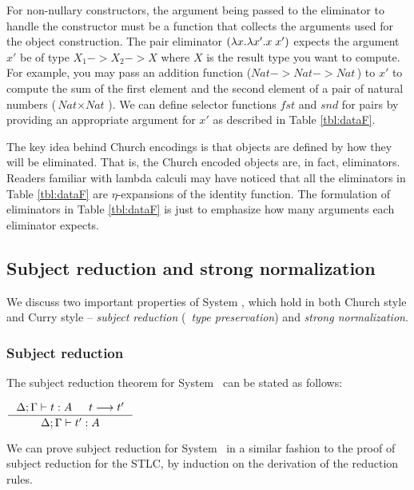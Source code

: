 For non-nullary constructors, the argument being passed to the eliminator
to handle the constructor must be a function that collects the arguments used
for the object construction. The pair eliminator $(\lambda x.\lambda x'.x\;x')$ expects
the argument $x'$ be of type $X_1 -> X_2 -> X$ where $X$ is the result type
you want to compute. For example, you may pass an addition function 
($\textit{Nat} -> \textit{Nat} -> \textit{Nat}\,$) to $x'$ to compute
the sum of the first element and the second element of a pair of
natural numbers ($\textit{Nat}\times\textit{Nat}\,$). We can define
selector functions $\mathit{fst}$ and $\mathit{snd}$ for pairs by
providing an appropriate
argument for $x'$ as described in Table \ref{tbl:dataF}.

The key idea behind Church encodings is that objects are defined by
how they will be eliminated. That is, the Church encoded objects
are, in fact, eliminators. Readers familiar with lambda calculi may have
noticed that all the eliminators in Table \ref{tbl:dataF} are
$\eta$-expansions of the identity function. The formulation of eliminators
in Table \ref{tbl:dataF} is just to emphasize how many arguments
each eliminator expects.

\subsection{Subject reduction and strong normalization}\label{sec:f:srsn}
We discuss two important properties of System \F, which hold in both
Church style and Curry style -- \emph{subject reduction} (\aka\
\emph{type preservation}) and \emph{strong normalization}.

\subsubsection*{Subject reduction}
The subject reduction theorem for System \F\ can be stated as follows:
\begin{theorem}
$\inference{\Delta;\Gamma |- t : A  & t --> t'}{\Delta;\Gamma |- t' : A}$
\end{theorem}
We can prove subject reduction for System \F\, in a similar fashion
to the proof of subject reduction for the STLC,
by induction on the derivation of the reduction rules.

